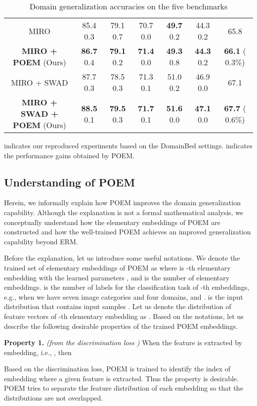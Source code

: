 \documentclass[letterpaper]{article} \usepackage{aaai23}  \usepackage{times}  \usepackage{helvet}  \usepackage{courier}  \usepackage[hyphens]{url}  \usepackage{graphicx} \urlstyle{rm} \def\UrlFont{\rm}  \usepackage{natbib}  \usepackage{caption} \frenchspacing  \setlength{\pdfpagewidth}{8.5in}  \setlength{\pdfpageheight}{11in}  \usepackage[labelsep=period]{caption}
\begin{document}
\begin{table*}[!ht]
\begin{tabular}{cccccc|c}
		\hline
		MIRO \cite{MIRO} & 85.4  0.3 & 79.1  0.7 & 70.7  0.0 & \textbf{49.7}  0.2 & 44.3  0.2 & 65.8\\
		\textbf{MIRO + POEM} (Ours) & \textbf{86.7}  0.4 & \textbf{79.1}  0.2 & \textbf{71.4}  0.0 & \textbf{49.3}  0.8 & \textbf{44.3}  0.2 & \textbf{66.1} ( 0.3\%)\\
		\bottomrule
		MIRO + SWAD & 87.7  0.3 & 78.5  0.3 & 71.3  0.1 & 51.0  0.2 & 46.9  0.0 & 67.1\\
		\textbf{MIRO + SWAD + POEM} (Ours) & \textbf{88.5}  0.1 & \textbf{79.5}  0.3 & \textbf{71.7}  0.1 & \textbf{51.6}  0.0 & \textbf{47.1}  0.0 & \textbf{67.7} ( 0.6\%)\\
		\hline
	\end{tabular}
 	\footnotesize{ indicates our reproduced experiments based on the DomainBed settings.  indicates the performance gains obtained by POEM.} 
    \caption{Domain generalization accuracies on the five benchmarks}
	\label{tab:target_performance}
\end{table*}

\subsection{Understanding of POEM}
Herein, we informally explain how POEM improves the domain generalization capability. 
Although the explanation is not a formal mathematical analysis, we conceptually understand how the elementary embeddings of POEM are constructed and how the well-trained POEM achieves an improved generalization capability beyond ERM. 

Before the explanation, let us introduce some useful notations.
We denote the trained set of elementary embeddings of POEM as  where  is -th elementary embedding with the learned parameters , and  is the number of elementary embeddings.  is the number of labels for the classification task of -th embeddings, e.g., when we have seven image categories and four domains,  and .
 is the input distribution that contains input samples .
Let us denote the distribution of feature vectors of -th elementary embedding as .
Based on the notations, let us describe the following desirable properties of the trained POEM embeddings.

\textbf{Property 1.} \textit{(from the discrimination loss )} When the feature  is extracted by   embedding, i.e., , then 


Based on the discrimination loss, POEM is trained to identify the index of embedding where a given feature is extracted. Thus the property is desirable. 
POEM tries to separate the feature distribution of each embedding so that the distributions are not overlapped.
\end{document}
